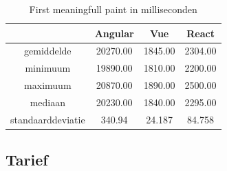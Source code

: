 \begin{table}[]
	\centering
	\caption{First meaningfull paint in milliseconden}
	\label{table:first_meaningfull_paint}
	\begin{tabular}{|c|c|c|c|} \hline
									&Angular       &Vue        &React      \\ \hline
		gemiddelde			&20270.00     &1845.00  &2304.00 \\ \hline
		minimuum			&19890.00     &1810.00  &2200.00  \\ \hline
		maximuum			&20870.00    &1890.00  &2500.00 \\ \hline
		mediaan				   &20230.00    &1840.00  &2295.00 \\ \hline
		standaarddeviatie &340.94        &24.187    &84.758    \\ \hline
	\end{tabular}
\end{table}

\subsection{Tarief}
\label{sec:tarief}







